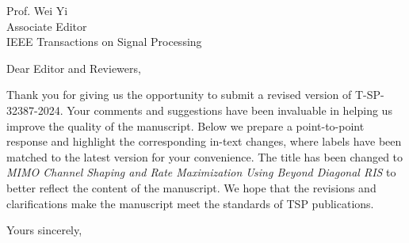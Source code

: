 \documentclass[
	fontsize=11pt,
	paper=a4,
	foldmarks=false
]{scrartcl}
\begin{document}
\begin{letter}{%
		Prof. Wei Yi\\
		Associate Editor\\
		IEEE Transactions on Signal Processing
	}
	\opening{Dear Editor and Reviewers,}
	Thank you for giving us the opportunity to submit a revised version of T-SP-32387-2024.
	Your comments and suggestions have been invaluable in helping us improve the quality of the manuscript.
	Below we prepare a point-to-point response and highlight the corresponding in-text changes, where labels have been matched to the latest version for your convenience.
	The title has been changed to \emph{MIMO Channel Shaping and Rate Maximization Using Beyond Diagonal RIS} to better reflect the content of the manuscript.
	We hope that the revisions and clarifications make the manuscript meet the standards of TSP publications.
	\closing{Yours sincerely,}
\end{letter}
\end{document}
